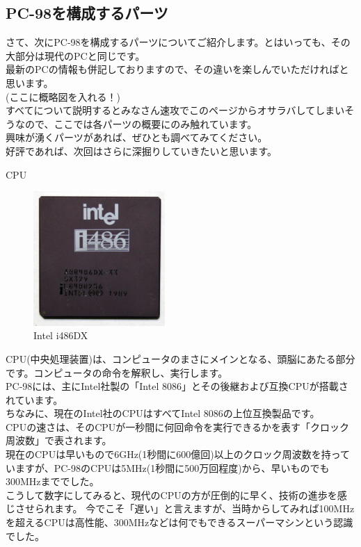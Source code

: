 \documentclass[b5paper,9pt,platex,dvipdfmx]{jsarticle}
\begin{document}
\begin{multicols}{3}
\section[short]{PC-98を構成するパーツ}
さて、次にPC-98を構成するパーツについてご紹介します。とはいっても、その大部分は現代のPCと同じです。\\
最新のPCの情報も併記しておりますので、その違いを楽しんでいただければと思います。\\
(ここに概略図を入れる！)\\
すべてについて説明するとみなさん速攻でこのページからオサラバしてしまいそうなので、ここでは各パーツの概要にのみ触れています。\\
興味が湧くパーツがあれば、ぜひとも調べてみてください。\\
好評であれば、次回はさらに深掘りしていきたいと思います。\\
\begin{enumerate}
  {\bf  \item CPU\\}
  \begin{figure}[H]
    \centering
    \includegraphics[width=5cm]{img-5.jpg}
    \caption{Intel i486DX}
  \end{figure}
CPU(中央処理装置)は、コンピュータのまさにメインとなる、頭脳にあたる部分です。コンピュータの命令を解釈し、実行します。\\
PC-98には、主にIntel社製の「Intel 8086」とその後継および互換CPUが搭載されています。\\
ちなみに、現在のIntel社のCPUはすべてIntel 8086の上位互換製品です。\\
CPUの速さは、そのCPUが一秒間に何回命令を実行できるかを表す「クロック周波数」で表されます。\\
現在のCPUは早いもので6GHz(1秒間に600億回)以上のクロック周波数を持っていますが、PC-98のCPUは5MHz(1秒間に500万回程度)から、早いものでも300MHzまででした。\\
こうして数字にしてみると、現代のCPUの方が圧倒的に早く、技術の進歩を感じさせられます。
今でこそ「遅い」と言えますが、当時からしてみれば100MHzを超えるCPUは高性能、300MHzなどは何でもできるスーパーマシンという認識でした。\\

\end{enumerate}
\end{multicols}
\end{document}
